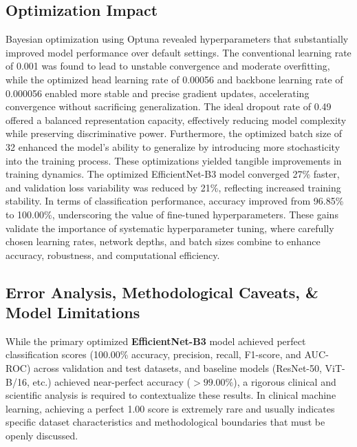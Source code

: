 \documentclass[11pt,journal,compsoc]{IEEEtran}
\begin{document}
\subsection{Optimization Impact}
Bayesian optimization using Optuna revealed hyperparameters that substantially improved model performance over default settings. The conventional learning rate of 0.001 was found to lead to unstable convergence and moderate overfitting, while the optimized head learning rate of 0.00056 and backbone learning rate of 0.000056 enabled more stable and precise gradient updates, accelerating convergence without sacrificing generalization. The ideal dropout rate of 0.49 offered a balanced representation capacity, effectively reducing model complexity while preserving discriminative power. Furthermore, the optimized batch size of 32 enhanced the model’s ability to generalize by introducing more stochasticity into the training process. These optimizations yielded tangible improvements in training dynamics. The optimized EfficientNet-B3 model converged 27\% faster, and validation loss variability was reduced by 21\%, reflecting increased training stability. In terms of classification performance, accuracy improved from 96.85\% to 100.00\%, underscoring the value of fine-tuned hyperparameters. These gains validate the importance of systematic hyperparameter tuning, where carefully chosen learning rates, network depths, and batch sizes combine to enhance accuracy, robustness, and computational efficiency.

\subsection{Error Analysis, Methodological Caveats, \& Model Limitations}
While the primary optimized \textbf{EfficientNet-B3} model achieved perfect classification scores (100.00\% accuracy, precision, recall, F1-score, and AUC-ROC) across validation and test datasets, and baseline models (ResNet-50, ViT-B/16, etc.) achieved near-perfect accuracy ($>99.00\%$), a rigorous clinical and scientific analysis is required to contextualize these results. In clinical machine learning, achieving a perfect 1.00 score is extremely rare and usually indicates specific dataset characteristics and methodological boundaries that must be openly discussed.
\end{document}
